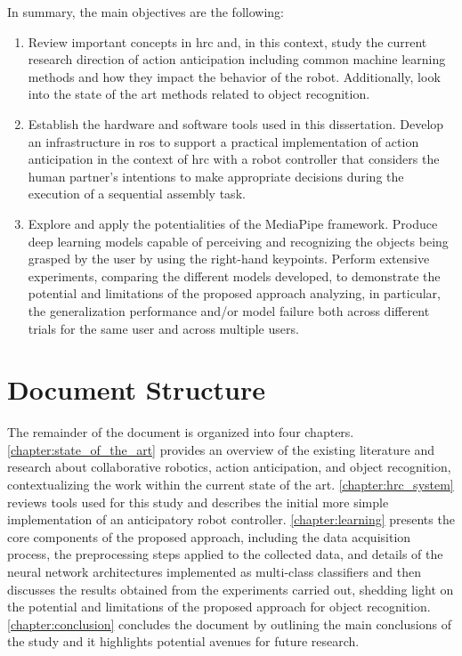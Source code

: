 In summary, the main objectives are the following:
\begin{enumerate}
    \item Review important concepts in \acs{hrc} and, in this context, study the current research direction of action anticipation including common machine learning methods and how they impact the behavior of the robot. Additionally, look into the state of the art methods related to object recognition.

    \item Establish the hardware and software tools used in this dissertation. Develop an infrastructure in \acs{ros} to support a practical implementation of action anticipation in the context of \acs{hrc} with a robot controller that considers the human partner's intentions to make appropriate decisions during the execution of a sequential assembly task.

    \item Explore and apply the potentialities of the MediaPipe framework. Produce deep learning models capable of perceiving and recognizing the objects being grasped by the user by using the right-hand keypoints. Perform extensive experiments, comparing the different models developed, to demonstrate the potential and limitations of the proposed approach analyzing, in particular, the generalization performance and/or model failure both across different trials for the same user and across multiple users.
\end{enumerate}

\section{Document Structure}

The remainder of the document is organized into four chapters. \autoref{chapter:state_of_the_art} provides an overview of the existing literature and research about collaborative robotics, action anticipation, and object recognition,  contextualizing the work within the current state of the art. \autoref{chapter:hrc_system} reviews tools used for this study and describes the initial more simple implementation of an anticipatory robot controller. \autoref{chapter:learning} presents the core components of the proposed approach, including the data acquisition process, the preprocessing steps applied to the collected data, and details of the neural network architectures implemented as multi-class classifiers and then discusses the results obtained from the experiments carried out, shedding light on the potential and limitations of the proposed approach for object recognition. \autoref{chapter:conclusion} concludes the document by outlining the main conclusions of the study and it highlights potential avenues for future research.

